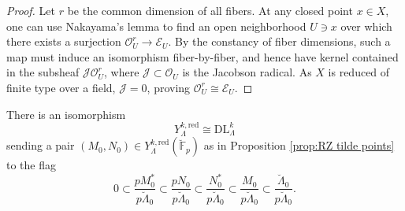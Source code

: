 \documentclass[11pt]{alggeom}
\newcommand{\iso}{\cong}
\newcommand{\red}{\mathrm{red}}
\newcommand{\F}{\mathbb F}
\newcommand{\co}{\mathcal O}
\begin{document}
\begin{proof}
Let $r$ be the common dimension of all fibers.  At any closed point $x \in X$, one can use Nakayama's lemma to find an open  neighborhood $U\ni x$ over which there exists  a surjection $\co_U^r \to \mathscr{E}_U$.
By the constancy of fiber dimensions, such a map must induce an isomorphism fiber-by-fiber, and hence have kernel contained in the subsheaf $\mathcal{J} \co_U^r$, where $\mathcal{J} \subset \co_U$ is the Jacobson radical.
As $X$ is reduced of finite type over a field, $\mathcal{J}=0$, proving $\co_U^r \iso \mathscr{E}_U$.
\end{proof}










\begin{theorem}\label{thm:YtoDL}
There is an  isomorphism 
\[
Y^{k,\red}_\Lambda \iso \mathrm{DL}_\Lambda^k
\]
sending a pair $(M_0,N_0) \in Y^{k,\red}_\Lambda( \breve{\F}_p)$ as in Proposition \ref{prop:RZ tilde points} to the flag 
\[
0 \subset   \frac{ p M_0^*}{ p\breve{\Lambda}_0 }     \subset   \frac{pN_0}{ p\breve{\Lambda}_0} 
  \subset   \frac{ N_0^* }{ p\breve{\Lambda}_0   }   \subset  \frac{ M_0 } { p\breve{\Lambda}_0 }  \subset  \frac{  \breve{\Lambda}_0} { p \breve{\Lambda}_0 }.
\]
\end{theorem}
\end{document}
